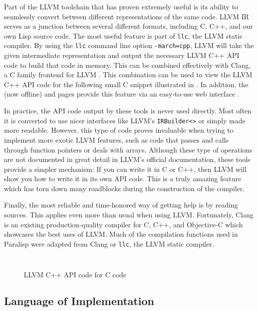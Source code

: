 \documentclass[
abstracton,
fontsize=12pt,
]{scrartcl}
\begin{document}
Part of the LLVM toolchain that has proven extremely useful is its ability to seamlessly convert between different representations of the same code. LLVM IR serves as a junction between several different formats, including C, C++, and our own Lisp source code. The most useful feature is part of \texttt{llc}, the LLVM static compiler. By using the \texttt{llc} command line option \texttt{-march=cpp}, LLVM will take the given intermediate representation and output the necessary LLVM C++ API code to build that code in memory. This can be combined effectively with Clang, a C family frontend for LLVM \autocite{clang}. This combination can be used to view the LLVM C++ API code for the following small C snippet illustrated in . In addition, the  (now offline) and  pages provide this feature via an easy-to-use web interface \autocites{llvm-demo}{ellcc-demo}.

In practice, the API code output by these tools is never used directly. Most often it is converted to use nicer interfaces like LLVM's \texttt{IRBuilder<>} or simply made more readable. However, this type of code proves invaluable when trying to implement more exotic LLVM features, such as code that passes and calls through function pointers or deals with arrays. Although these type of operations are not documented in great detail in LLVM's official documentation, these tools provide a simpler mechanism: If you can write it in C or C++, then LLVM will show you how to write it in its own API code. This is a truly amazing feature which has torn down many roadblocks during the construction of the compiler.

Finally, the most reliable and time-honored way of getting help is by reading sources. This applies even more than usual when using LLVM\@. Fortunately, Clang is an existing production-quality compiler for C, C++, and Objective-C which showcases the best uses of LLVM\@. Much of the compilation functions used in Paralisp were adapted from Clang or \texttt{llc}, the LLVM static compiler.

\begin{figure}
  \inputminted[tabsize=4,frame=single,label=funcptr.c]{c}{code/funcptr.c}
  \inputminted[frame=single,label=Command line]{bash}{code/clang-llc-funcptr.bash}
  \caption{LLVM C++ API code for C code}\label{fig:llvm-api-for-c}
\end{figure}

\subsection{Language of Implementation}
\end{document}
